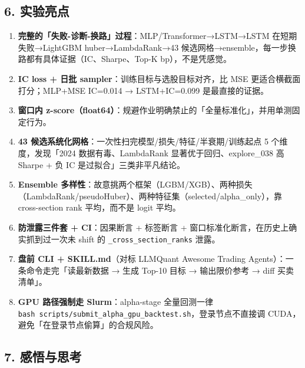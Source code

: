 \documentclass[
  fontset=fandol]{ctexart}
\providecommand{\tightlist}{%
  \setlength{\itemsep}{0pt}\setlength{\parskip}{0pt}}
\begin{document}
\hypertarget{ux5b9eux9a8cux4eaeux70b9}{%
\subsection{6.
实验亮点}\label{ux5b9eux9a8cux4eaeux70b9}}

\begin{enumerate}
\def\labelenumi{\arabic{enumi}.}
\tightlist
\item
  \textbf{完整的「失败-诊断-换路」过程}：MLP/Transformer→LSTM→LSTM
  在短期失败→LightGBM
  huber→LambdaRank→43
  候选网格→ensemble，每一步换路都有具体证据（IC、Sharpe、Top-K
  bp），不是凭感觉。
\item
  \textbf{IC loss + 日批
  sampler}：训练目标与选股目标对齐，比
  MSE 更适合横截面打分；MLP+MSE IC=0.014
  → LSTM+IC=0.099 是最直接的证据。
\item
  \textbf{窗口内
  z-score（float64）}：规避作业明确禁止的「全量标准化」，并用单测固定行为。
\item
  \textbf{43
  候选系统化网格}：一次性扫完模型/损失/特征/半衰期/训练起点
  5 个维度，发现「2024
  数据有毒、LambdaRank
  显著优于回归、explore\_038 高 Sharpe +
  负 IC 是过拟合」三类非平凡结论。
\item
  \textbf{Ensemble
  多样性}：故意挑两个框架（LGBM/XGB）、两种损失（LambdaRank/pseudoHuber）、两种特征集（selected/alpha\_only），靠
  cross-section rank 平均，而不是 logit
  平均。
\item
  \textbf{防泄露三件套 + CI}：因果断言 +
  标签断言 +
  窗口标准化断言，在历史上确实抓到过一次未
  shift 的
  \texttt{\_cross\_section\_ranks}
  泄露。
\item
  \textbf{盘前 CLI + SKILL.md}（对标
  LLMQuant Awesome Trading
  Agents）：一条命令走完「读最新数据 →
  生成 Top-10 目标 → 输出限价参考 → diff
  买卖清单」。
\item
  \textbf{GPU 路径强制走
  Slurm}：alpha-stage 全量回测一律
  \texttt{bash\ scripts/submit\_alpha\_gpu\_backtest.sh}，登录节点不直接调
  CUDA，避免「在登录节点偷算」的合规风险。
\end{enumerate}

\hypertarget{ux611fux609fux4e0eux601dux8003}{%
\subsection{7.
感悟与思考}\label{ux611fux609fux4e0eux601dux8003}}
\end{document}
